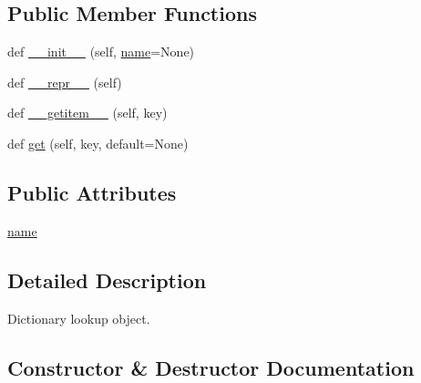 \subsection*{Public Member Functions}
\begin{DoxyCompactItemize}
\item 
def \hyperlink{classpip_1_1__vendor_1_1requests_1_1structures_1_1LookupDict_a2bf08563ed8645feec80eae1dc83159c}{\+\_\+\+\_\+init\+\_\+\+\_\+} (self, \hyperlink{classpip_1_1__vendor_1_1requests_1_1structures_1_1LookupDict_a7ca3c1a94915e595049a0e1673041848}{name}=None)
\item 
def \hyperlink{classpip_1_1__vendor_1_1requests_1_1structures_1_1LookupDict_a51b639b0c8dac9a204d602a151962cb1}{\+\_\+\+\_\+repr\+\_\+\+\_\+} (self)
\item 
def \hyperlink{classpip_1_1__vendor_1_1requests_1_1structures_1_1LookupDict_a05faee494783507c5ac89890b576950c}{\+\_\+\+\_\+getitem\+\_\+\+\_\+} (self, key)
\item 
def \hyperlink{classpip_1_1__vendor_1_1requests_1_1structures_1_1LookupDict_aefa5cb718796e979a5b682650a777897}{get} (self, key, default=None)
\end{DoxyCompactItemize}
\subsection*{Public Attributes}
\begin{DoxyCompactItemize}
\item 
\hyperlink{classpip_1_1__vendor_1_1requests_1_1structures_1_1LookupDict_a7ca3c1a94915e595049a0e1673041848}{name}
\end{DoxyCompactItemize}


\subsection{Detailed Description}
\begin{DoxyVerb}Dictionary lookup object.\end{DoxyVerb}
 

\subsection{Constructor \& Destructor Documentation}
\mbox{\label{classpip_1_1__vendor_1_1requests_1_1structures_1_1LookupDict_a2bf08563ed8645feec80eae1dc83159c}} 
